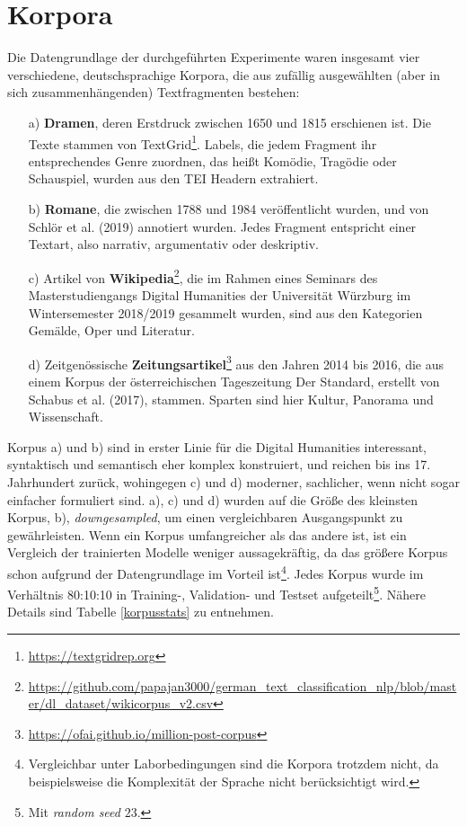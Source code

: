 \section{Korpora}
\label{korpora}

Die Datengrundlage der durchgeführten Experimente waren insgesamt vier verschiedene, deutschsprachige Korpora, die aus zufällig ausgewählten (aber in sich zusammenhängenden) Textfragmenten bestehen:


\begin{itemize}
\item[a)] \textbf{Dramen}, deren Erstdruck zwischen 1650 und 1815 erschienen ist. Die Texte stammen von TextGrid\footnote{\url{https://textgridrep.org}}. Labels, die jedem Fragment ihr entsprechendes Genre zuordnen, das heißt Komödie, Tragödie oder Schauspiel, wurden aus den TEI Headern extrahiert.
\item[b)] \textbf{Romane}, die zwischen 1788 und 1984 veröffentlicht wurden, und von Schlör et al. (2019) annotiert wurden. Jedes Fragment entspricht einer Textart, also narrativ, argumentativ oder deskriptiv.
\item[c)] Artikel von \textbf{Wikipedia}\footnote{\url{https://github.com/papajan3000/german_text_classification_nlp/blob/master/dl_dataset/wikicorpus_v2.csv}}, die im Rahmen eines Seminars des Masterstudiengangs Digital Humanities der Universität Würzburg im Wintersemester 2018/2019 gesammelt wurden, sind aus den Kategorien Gemälde, Oper und Literatur.
\item[d)] Zeitgenössische \textbf{Zeitungsartikel}\footnote{\url{https://ofai.github.io/million-post-corpus}} aus den Jahren 2014 bis 2016, die aus einem Korpus der österreichischen Tageszeitung Der Standard, erstellt von Schabus et al. (2017), stammen. Sparten sind hier Kultur, Panorama und Wissenschaft.
\end{itemize}

Korpus a) und b) sind in erster Linie für die Digital Humanities interessant, syntaktisch und semantisch eher komplex konstruiert, und reichen bis ins 17. Jahrhundert zurück, wohingegen c) und d) moderner, sachlicher, wenn nicht sogar einfacher formuliert sind. a), c) und d) wurden auf die Größe des kleinsten Korpus, b), \textit{downgesampled}, um einen vergleichbaren Ausgangspunkt zu gewährleisten. Wenn ein Korpus umfangreicher als das andere ist, ist ein Vergleich der trainierten Modelle weniger aussagekräftig, da das größere Korpus schon aufgrund der Datengrundlage im Vorteil ist\footnote{Vergleichbar unter Laborbedingungen sind die Korpora trotzdem nicht, da beispielsweise die Komplexität der Sprache nicht berücksichtigt wird.}. Jedes Korpus wurde im Verhältnis 80:10:10 in Training-, Validation- und Testset aufgeteilt\footnote{Mit \textit{random seed} $23$.}. Nähere Details sind Tabelle \ref{korpusstats} zu entnehmen.

